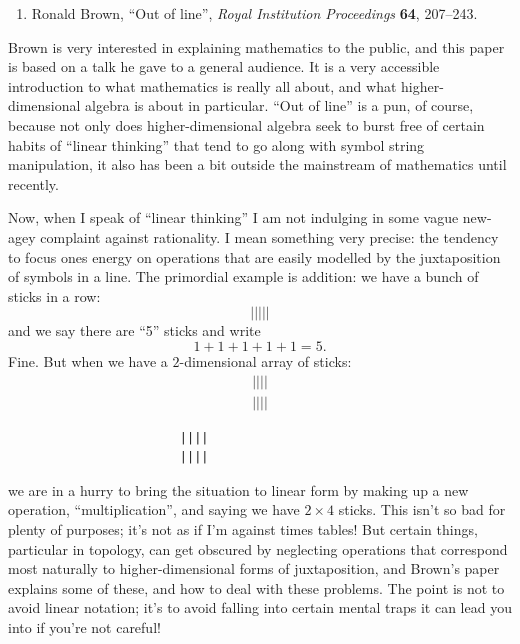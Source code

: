 \documentclass{article}
\def\tightlist{}
\renewcommand{\texttt}[1]{%
  \begingroup
  \ttfamily
  \begingroup\lccode`~=`/\lowercase{\endgroup\def~}{/\discretionary{}{}{}}%
  \begingroup\lccode`~=`[\lowercase{\endgroup\def~}{[\discretionary{}{}{}}%
  \begingroup\lccode`~=`.\lowercase{\endgroup\def~}{.\discretionary{}{}{}}%
  \catcode`/=\active\catcode`[=\active\catcode`.=\active
  \scantokens{#1\noexpand}%
  \endgroup
}
\begin{document}
\begin{enumerate}
\def\labelenumi{\arabic{enumi})}
\tightlist
\item
  Ronald Brown, ``Out of line'', \emph{Royal Institution Proceedings}
  \textbf{64}, 207--243.
\end{enumerate}

Brown is very interested in explaining mathematics to the public, and
this paper is based on a talk he gave to a general audience. It is a
very accessible introduction to what mathematics is really all about,
and what higher-dimensional algebra is about in particular. ``Out of
line'' is a pun, of course, because not only does higher-dimensional
algebra seek to burst free of certain habits of ``linear thinking'' that
tend to go along with symbol string manipulation, it also has been a bit
outside the mainstream of mathematics until recently.

Now, when I speak of ``linear thinking'' I am not indulging in some
vague new-agey complaint against rationality. I mean something very
precise: the tendency to focus ones energy on operations that are easily
modelled by the juxtaposition of symbols in a line. The primordial
example is addition: we have a bunch of sticks in a row:
\[\vert\vert\vert\vert\vert\] and we say there are ``5'' sticks and
write \[1+1+1+1+1=5.\] Fine. But when we have a \(2\)-dimensional array
of sticks:
\[\begin{gathered}\vert\vert\vert\vert\\\vert\vert\vert\vert\end{gathered}\]

\begin{verbatim}
                        ||||
                        ||||
\end{verbatim}

we are in a hurry to bring the situation to linear form by making up a
new operation, ``multiplication'', and saying we have \(2 \times 4\)
sticks. This isn't so bad for plenty of purposes; it's not as if I'm
against times tables! But certain things, particular in topology, can
get obscured by neglecting operations that correspond most naturally to
higher-dimensional forms of juxtaposition, and Brown's paper explains
some of these, and how to deal with these problems. The point is not to
avoid linear notation; it's to avoid falling into certain mental traps
it can lead you into if you're not careful!

\end{document}
